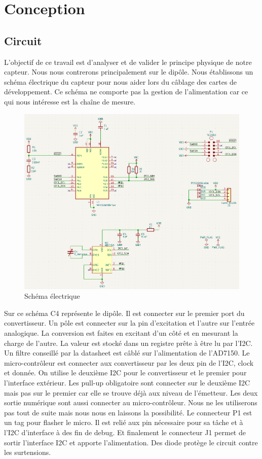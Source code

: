 \graphicspath{ {./figuresConception} }
\section{Conception}

\subsection{Circuit}
L'objectif de ce travail est d'analyser et de valider le principe physique de notre capteur. Nous nous contrerons principalement sur le dipôle. Nous établissons un schéma électrique du capteur pour nous aider lors du câblage des cartes de développement. Ce schéma ne comporte pas la gestion de l'alimentation car ce qui nous intéresse est la chaîne de mesure.

\begin{figure}[!ht]
 \centering
 \includegraphics[width=14cm]{schemaelec.png}
 \caption{Schéma électrique}
\end{figure}

Sur ce schéma C4 représente le dipôle. Il est connecter sur le premier port du convertisseur. Un pôle est connecter sur la pin d'excitation et l'autre sur l'entrée analogique. La conversion est faites en excitant d'un côté et en mesurant la charge de l'autre. La valeur est stocké dans un registre prête à être lu par l'I2C. Un filtre conseillé par la datasheet est câblé sur l'alimentation de l'AD7150. Le micro-contrôleur est connecter aux convertisseur par les deux pin de l'I2C, clock et donnée. On utilise le deuxième I2C pour le convertisseur et le premier pour l'interface extérieur. Les pull-up obligatoire sont connecter sur le deuxième I2C mais pas sur le premier car elle se trouve déjà aux niveau de l'émetteur. Les deux sortie numérique sont aussi connecter au micro-contrôleur. Nous ne les utiliserons pas tout de suite mais nous nous en laissons la possibilité. Le connecteur P1 est un tag pour flasher le micro. Il est relié aux pin nécessaire pour sa tâche et à l'I2C d'interface à des fin de debug. Et finalement le connecteur J1 permet de sortir l'interface I2C et apporte l'alimentation. Des diode protège le circuit contre les surtensions.  

